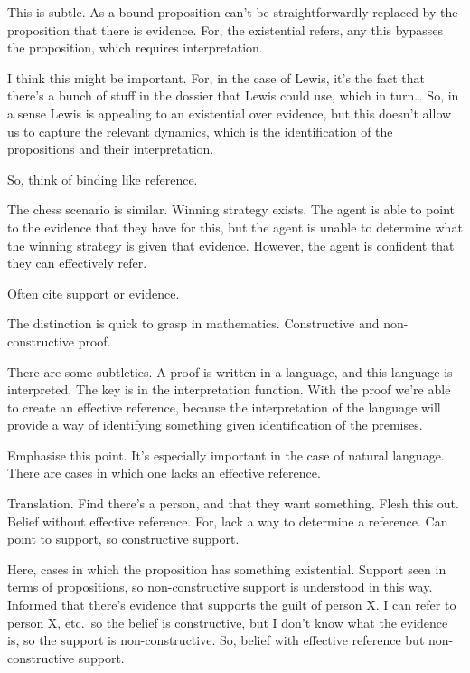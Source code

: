 \documentclass[10pt]{article}
\begin{document}
This is subtle.
As a bound proposition can't be straightforwardly replaced by the proposition that there is evidence.
For, the existential refers, any this bypasses the proposition, which requires interpretation.
\begin{note}
  I think this might be important.
  For, in the case of Lewis, it's the fact that there's a bunch of stuff in the dossier that Lewis could use, which in turn\dots
  So, in a sense Lewis is appealing to an existential over evidence, but this doesn't allow us to capture the relevant dynamics, which is the identification of the propositions and their interpretation.

  So, think of binding like reference.
  
\end{note}


The chess scenario is similar.
Winning strategy exists.
The agent is able to point to the evidence that they have for this, but the agent is unable to determine what the winning strategy is given that evidence.
However, the agent is confident that they can effectively refer.







Often cite support or evidence.



The distinction is quick to grasp in mathematics.
Constructive and non-constructive proof.

There are some subtleties.
A proof is written in a language, and this language is interpreted.
The key is in the interpretation function.
With the proof we're able to create an effective reference, because the interpretation of the language will provide a way of identifying something given identification of the premises.

Emphasise this point.
It's especially important in the case of natural language.
There are cases in which one lacks an effective reference.

Translation.
Find there's a person, and that they want something.
Flesh this out.
Belief without effective reference.
For, lack a way to determine a reference.
Can point to support, so constructive support.

Here, cases in which the proposition has something existential.
Support seen in terms of propositions, so non-constructive support is understood in this way.
Informed that there's evidence that supports the guilt of person X.
I can refer to person X, etc.\ so the belief is constructive, but I don't know what the evidence is, so the support is non-constructive.
So, belief with effective reference but non-constructive support.
\end{document}

